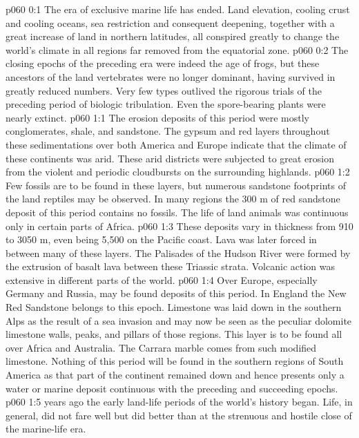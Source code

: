 \author{Life Carrier}
\vs p060 0:1 The era of exclusive marine life has ended. Land elevation, cooling crust and cooling oceans, sea restriction and consequent deepening, together with a great increase of land in northern latitudes, all conspired greatly to change the world’s climate in all regions far removed from the equatorial zone.
\vs p060 0:2 The closing epochs of the preceding era were indeed the age of frogs, but these ancestors of the land vertebrates were no longer dominant, having survived in greatly reduced numbers. Very few types outlived the rigorous trials of the preceding period of biologic tribulation. Even the spore\hyp{}bearing plants were nearly extinct.
\vs p060 1:1 The erosion deposits of this period were mostly conglomerates, shale, and sandstone. The gypsum and red layers throughout these sedimentations over both America and Europe indicate that the climate of these continents was arid. These arid districts were subjected to great erosion from the violent and periodic cloudbursts on the surrounding highlands.
\vs p060 1:2 Few fossils are to be found in these layers, but numerous sandstone footprints of the land reptiles may be observed. In many regions the 300 m of red sandstone deposit of this period contains no fossils. The life of land animals was continuous only in certain parts of Africa.
\vs p060 1:3 These deposits vary in thickness from 910 to 3050 m, even being 5,500 on the Pacific coast. Lava was later forced in between many of these layers. The Palisades of the Hudson River were formed by the extrusion of basalt lava between these Triassic strata. Volcanic action was extensive in different parts of the world.
\vs p060 1:4 Over Europe, especially Germany and Russia, may be found deposits of this period. In England the New Red Sandstone belongs to this epoch. Limestone was laid down in the southern Alps as the result of a sea invasion and may now be seen as the peculiar dolomite limestone walls, peaks, and pillars of those regions. This layer is to be found all over Africa and Australia. The Carrara marble comes from such modified limestone. Nothing of this period will be found in the southern regions of South America as that part of the continent remained down and hence presents only a water or marine deposit continuous with the preceding and succeeding epochs.
\vs p060 1:5 \pc {} years ago the early land\hyp{}life periods of the world’s history began. Life, in general, did not fare well but did better than at the strenuous and hostile close of the marine\hyp{}life era.
